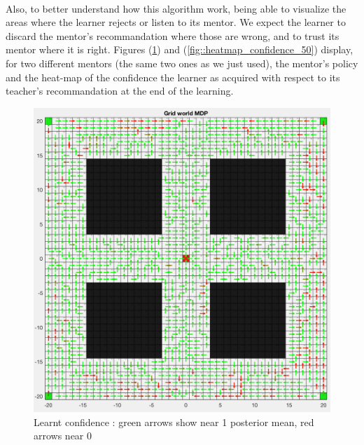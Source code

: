 \documentclass[a4paper]{report}
\begin{document}
{{{{				\paragraph{} Also, to better understand how this algorithm work, being able to visualize the areas where the learner rejects or listen to its mentor. We expect the learner to discard the mentor's recommandation where those are wrong, and to trust its mentor where it is right. Figures (\ref{fig::heatmap_confidence_120}) and (\ref{fig::heatmap_confidence_50}) display, for two different mentors (the same two ones as we just used), the mentor's policy and the heat-map of the confidence the learner as acquired with respect to its teacher's recommandation at the end of the learning. 
				
				 \begin{figure}[h!]
					\begin{minipage}{0.5\linewidth}
						\begin{center}
							\includegraphics[width=0.95\linewidth]{heatmap_confidence_120}
							\caption{Learnt confidence : green arrows show near 1 posterior mean, red arrows near 0}
							\label{fig::heatmap_confidence_120}
						\end{center}
					\end{minipage}
					\begin{minipage}{0.5\linewidth}
						\begin{center}

\end{center}
\end{minipage}
\end{figure}}}}}
\end{document}
